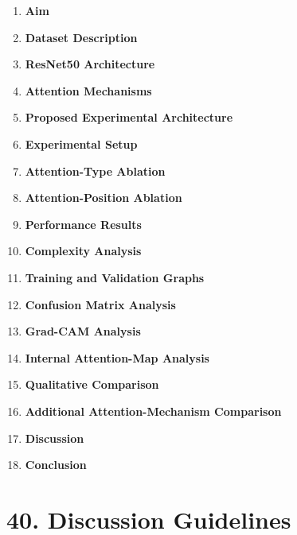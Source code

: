 \documentclass[10pt]{article}
\begin{document}
\begin{enumerate}

\item \textbf{Aim}

\item \textbf{Dataset Description}

\item \textbf{ResNet50 Architecture}

\item \textbf{Attention Mechanisms}

\item \textbf{Proposed Experimental Architecture}

\item \textbf{Experimental Setup}

\item \textbf{Attention-Type Ablation}

\item \textbf{Attention-Position Ablation}

\item \textbf{Performance Results}

\item \textbf{Complexity Analysis}

\item \textbf{Training and Validation Graphs}

\item \textbf{Confusion Matrix Analysis}

\item \textbf{Grad-CAM Analysis}

\item \textbf{Internal Attention-Map Analysis}

\item \textbf{Qualitative Comparison}

\item \textbf{Additional Attention-Mechanism Comparison}

\item \textbf{Discussion}

\item \textbf{Conclusion}

\end{enumerate}

\section*{40. Discussion Guidelines}
\end{document}

